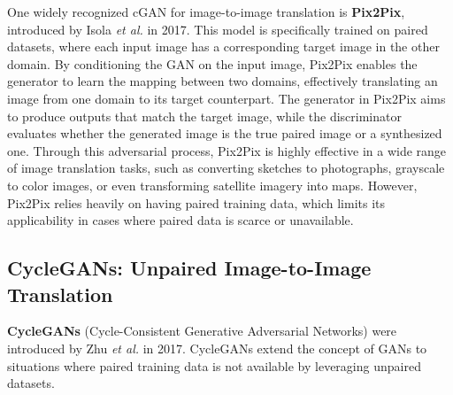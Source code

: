 \documentclass[12pt,DIV14,BCOR12mm,a4paper,footinclude=false,headinclude,parskip=half-,twoside,openright,cleardoublepage=empty,toc=index,bibliography=totoc,listof=totoc]{scrreprt}
\numberwithin{equation}{chapter}
\begin{document}
One widely recognized cGAN for image-to-image translation is \textbf{Pix2Pix}, introduced by Isola \textit{et al.} in 2017\cite{isola2017image}. This model is specifically trained on paired datasets, where each input image has a corresponding target image in the other domain. By conditioning the GAN on the input image, Pix2Pix enables the generator to learn the mapping between two domains, effectively translating an image from one domain to its target counterpart. The generator in Pix2Pix aims to produce outputs that match the target image, while the discriminator evaluates whether the generated image is the true paired image or a synthesized one. Through this adversarial process, Pix2Pix is highly effective in a wide range of image translation tasks, such as converting sketches to photographs\cite{sangkloy2017scribbler}, grayscale to color images, or even transforming satellite imagery into maps. However, Pix2Pix relies heavily on having paired training data, which limits its applicability in cases where paired data is scarce or unavailable.
\subsection{CycleGANs: Unpaired Image-to-Image Translation}
\textbf{CycleGANs} (Cycle-Consistent Generative Adversarial Networks) were introduced by Zhu \textit{et al.} in 2017. CycleGANs extend the concept of GANs to situations where paired training data is not available by leveraging unpaired datasets\cite{zhu2017unpaired}.
\end{document}
